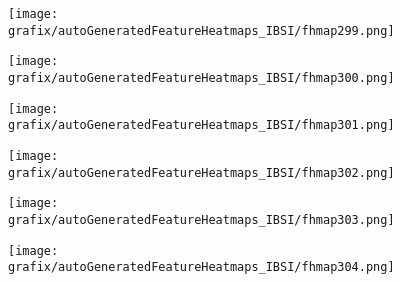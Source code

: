 \hspace{\hsp} 
\begin{subfigure}{\wid\textwidth} 
    \centering 
    \caption{\tiny \sffamily {}} 
    \vspace{\vsp} 
    \texttt{[image: grafix/autoGeneratedFeatureHeatmaps\_IBSI/fhmap299.png]} 
\end{subfigure} 
\hspace{\hsp} 
\begin{subfigure}{\wid\textwidth} 
    \centering 
    \caption{\tiny \sffamily {}} 
    \vspace{\vsp} 
    \texttt{[image: grafix/autoGeneratedFeatureHeatmaps\_IBSI/fhmap300.png]} 
\end{subfigure} 
\hspace{\hsp} 
\begin{subfigure}{\wid\textwidth} 
    \centering 
    \caption{\tiny \sffamily {}} 
    \vspace{\vsp} 
    \texttt{[image: grafix/autoGeneratedFeatureHeatmaps\_IBSI/fhmap301.png]} 
\end{subfigure} 
\hspace{\hsp} 
\begin{subfigure}{\wid\textwidth} 
    \centering 
    \caption{\tiny \sffamily {}} 
    \vspace{\vsp} 
    \texttt{[image: grafix/autoGeneratedFeatureHeatmaps\_IBSI/fhmap302.png]} 
\end{subfigure} 
\hspace{\hsp} 
\begin{subfigure}{\wid\textwidth} 
    \centering 
    \caption{\tiny \sffamily {}} 
    \vspace{\vsp} 
    \texttt{[image: grafix/autoGeneratedFeatureHeatmaps\_IBSI/fhmap303.png]} 
\end{subfigure} 
\hspace{\hsp} 
\begin{subfigure}{\wid\textwidth} 
    \centering 
    \caption{\tiny \sffamily {}} 
    \vspace{\vsp} 
    \texttt{[image: grafix/autoGeneratedFeatureHeatmaps\_IBSI/fhmap304.png]} 
\end{subfigure} 
\hspace{\hsp} 
